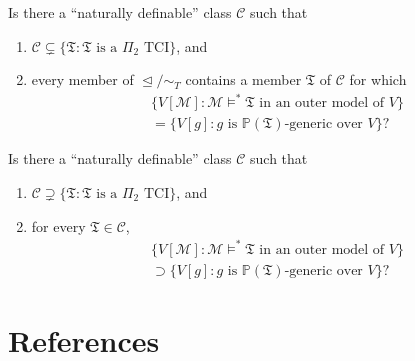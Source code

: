 \documentclass[12pt]{article}
\numberwithin{equation}{section}
\begin{document}
\begin{ques}
Is there a ``naturally definable'' class $\mathcal{C}$ such that 
\begin{enumerate}[label=(\alph*)]
    \item $\mathcal{C} \subsetneq \{\mathfrak{T} : \mathfrak{T} \text{ is a } \Pi_2 \text{ TCI}\}$, and
    \item every member of $\trianglelefteq / \sim_T$ contains a member $\mathfrak{T}$ of $\mathcal{C}$ for which
    \begin{align*}
        & \{V[\mathcal{M}] : \mathcal{M} \models^* \mathfrak{T} \text{ in an outer model of } V\} \\
        & = \{V[g] : g \text{ is } \mathbb{P}(\mathfrak{T}) \text{-generic over } V\} \text{?}
    \end{align*}
\end{enumerate} 
\end{ques}

\begin{ques}
Is there a ``naturally definable'' class $\mathcal{C}$ such that 
\begin{enumerate}[label=(\alph*)]
    \item $\mathcal{C} \supsetneq \{\mathfrak{T} : \mathfrak{T} \text{ is a } \Pi_2 \text{ TCI}\}$, and
    \item for every $\mathfrak{T} \in \mathcal{C}$,
    \begin{align*}
        & \{V[\mathcal{M}] : \mathcal{M} \models^* \mathfrak{T} \text{ in an outer model of } V\} \\
        & \supset \{V[g] : g \text{ is } \mathbb{P}(\mathfrak{T}) \text{-generic over } V\} \text{?}
    \end{align*}
\end{enumerate} 
\end{ques}

\section{References}
\printbibliography[heading=none]
\end{document}
